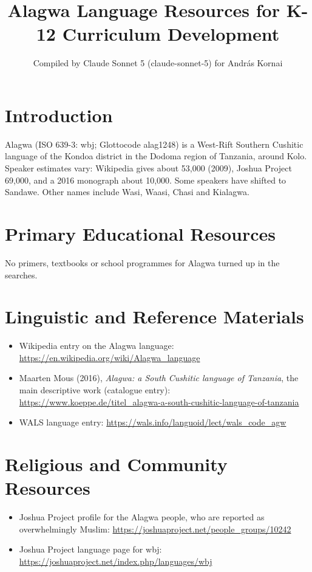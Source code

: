 \documentclass[12pt]{article}
\title{Alagwa Language Resources for K-12 Curriculum Development}
\author{Compiled by Claude Sonnet 5 (claude-sonnet-5) for Andr\'as Kornai}
\date{}
\begin{document}
\maketitle

\section{Introduction}
Alagwa (ISO 639-3: wbj; Glottocode alag1248) is a West-Rift Southern Cushitic language of the Kondoa district in the Dodoma region of Tanzania, around Kolo. Speaker estimates vary: Wikipedia gives about 53,000 (2009), Joshua Project 69,000, and a 2016 monograph about 10,000. Some speakers have shifted to Sandawe. Other names include Wasi, Waasi, Chasi and Kialagwa.

\section{Primary Educational Resources}
No primers, textbooks or school programmes for Alagwa turned up in the searches.

\section{Linguistic and Reference Materials}
\begin{itemize}
\item Wikipedia entry on the Alagwa language: \url{https://en.wikipedia.org/wiki/Alagwa_language}
\item Maarten Mous (2016), \emph{Alagwa: a South Cushitic language of Tanzania}, the main descriptive work (catalogue entry): \url{https://www.koeppe.de/titel_alagwa-a-south-cushitic-language-of-tanzania}
\item WALS language entry: \url{https://wals.info/languoid/lect/wals_code_agw}
\end{itemize}

\section{Religious and Community Resources}
\begin{itemize}
\item Joshua Project profile for the Alagwa people, who are reported as overwhelmingly Muslim: \url{https://joshuaproject.net/people_groups/10242}
\item Joshua Project language page for wbj: \url{https://joshuaproject.net/index.php/languages/wbj}
\end{itemize}
\end{document}
